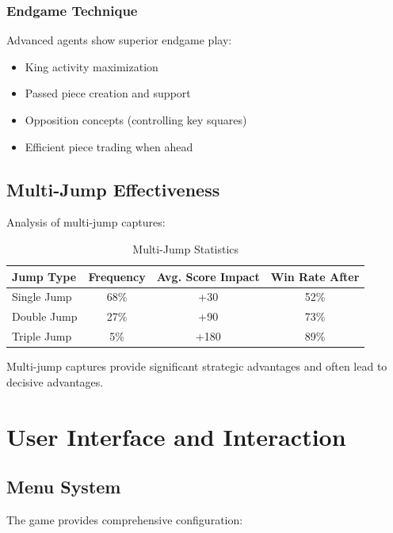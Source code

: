 \documentclass[12pt,a4paper]{article}
\begin{document}
\subsubsection{Endgame Technique}

Advanced agents show superior endgame play:
\begin{itemize}
    \item King activity maximization
    \item Passed piece creation and support
    \item Opposition concepts (controlling key squares)
    \item Efficient piece trading when ahead
\end{itemize}

\subsection{Multi-Jump Effectiveness}

Analysis of multi-jump captures:

\begin{table}[H]
\centering
\caption{Multi-Jump Statistics}
\begin{tabular}{@{}lccc@{}}
\toprule
\textbf{Jump Type} & \textbf{Frequency} & \textbf{Avg. Score Impact} & \textbf{Win Rate After} \\
\midrule
Single Jump & 68\% & +30 & 52\% \\
Double Jump & 27\% & +90 & 73\% \\
Triple Jump & 5\% & +180 & 89\% \\
\bottomrule
\end{tabular}
\end{table}

Multi-jump captures provide significant strategic advantages and often lead to decisive advantages.

\section{User Interface and Interaction}

\subsection{Menu System}

The game provides comprehensive configuration:
\end{document}
